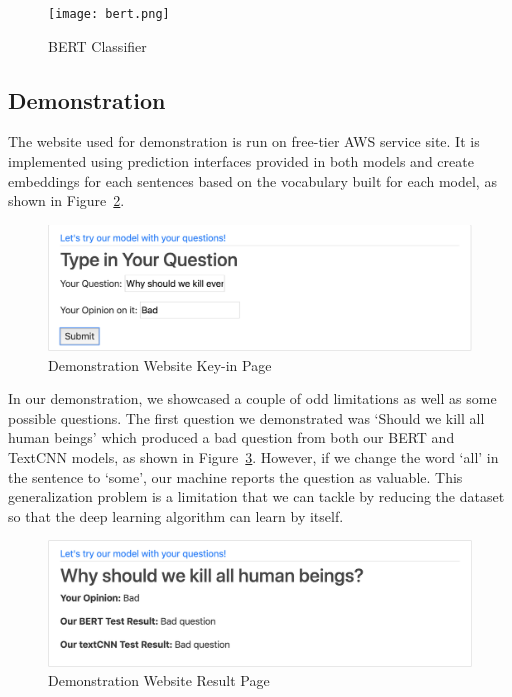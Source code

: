 \documentclass{article}
\begin{document}
\begin{figure}[h!]
	\centering
	\texttt{[image: bert.png]}
	\caption{BERT Classifier}
	\label{fig:bert}
\end{figure}

\newpage
\subsection{Demonstration}
The website used for demonstration is run on free-tier AWS service site. It is implemented using prediction interfaces provided in both models and create embeddings for each sentences based on the vocabulary built for each model, as shown in Figure~\ref{fig:demo1}.

\begin{figure}[h!]
	\centering
	\includegraphics[scale=0.5]{demo1.png}
	\caption{Demonstration Website Key-in Page}
	\label{fig:demo1}
\end{figure}

In our demonstration, we showcased a couple of odd limitations as well as some possible questions. The first question we demonstrated was ‘Should we kill all human beings’ which produced a bad question from both our BERT and TextCNN models, as shown in Figure~\ref{fig:demo2}. However, if we change the word ‘all’ in the sentence to ‘some’, our machine reports the question as valuable. This generalization problem is a limitation that we can tackle by reducing the dataset so that the deep learning algorithm can learn by itself. 

\begin{figure}[h!]
	\centering
	\includegraphics[scale=0.5]{demo2.png}
	\caption{Demonstration Website Result Page}
	\label{fig:demo2}
\end{figure}
\end{document}
